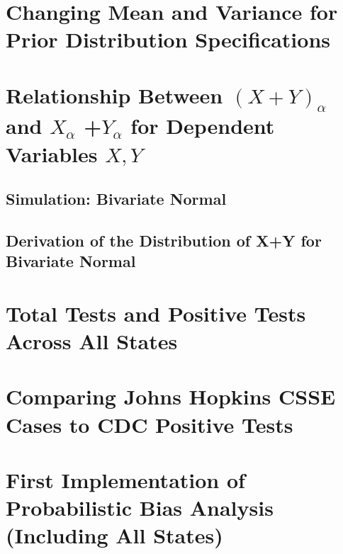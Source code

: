 \documentclass[12pt,twoside]{smiththesis}
\begin{document}
\hypertarget{changing-mean-and-variance-for-prior-distribution-specifications}{%
\section{Changing Mean and Variance for Prior Distribution Specifications}\label{changing-mean-and-variance-for-prior-distribution-specifications}}

\hypertarget{conservativeintervals}{%
\section{\texorpdfstring{Relationship Between \((X+Y)_\alpha\) and \(X_{\alpha}\) +\(Y_{\alpha}\) for Dependent Variables \(X,Y\)}{Relationship Between (X+Y)\_\textbackslash alpha and X\_\{\textbackslash alpha\} +Y\_\{\textbackslash alpha\} for Dependent Variables X,Y}}\label{conservativeintervals}}

\hypertarget{simulation-bivariate-normal}{%
\subsection{Simulation: Bivariate Normal}\label{simulation-bivariate-normal}}

\hypertarget{derivation-of-the-distribution-of-xy-for-bivariate-normal}{%
\subsection{Derivation of the Distribution of X+Y for Bivariate Normal}\label{derivation-of-the-distribution-of-xy-for-bivariate-normal}}

\hypertarget{total-tests-and-positive-tests-across-all-states}{%
\section{Total Tests and Positive Tests Across All States}\label{total-tests-and-positive-tests-across-all-states}}

\hypertarget{comparing-johns-hopkins-csse-cases-to-cdc-positive-tests}{%
\section{Comparing Johns Hopkins CSSE Cases to CDC Positive Tests}\label{comparing-johns-hopkins-csse-cases-to-cdc-positive-tests}}

\hypertarget{first-implementation-of-probabilistic-bias-analysis-including-all-states}{%
\section{First Implementation of Probabilistic Bias Analysis (Including All States)}\label{first-implementation-of-probabilistic-bias-analysis-including-all-states}}
\end{document}
